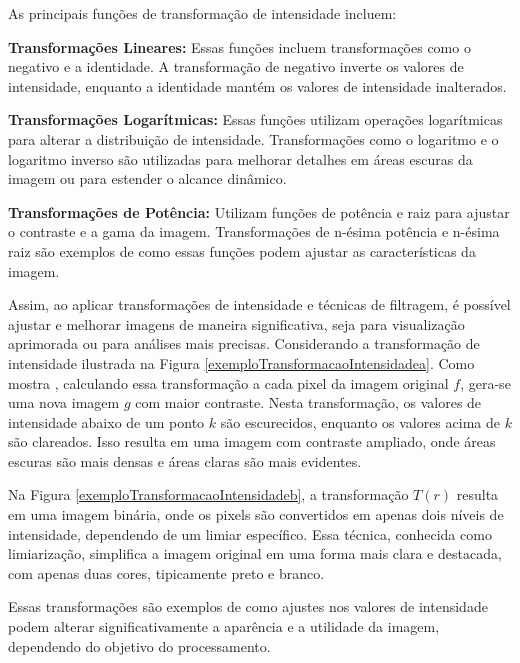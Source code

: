As principais funções de transformação de intensidade incluem:

\textbf{Transformações Lineares:} Essas funções incluem transformações como o negativo e a identidade. A transformação de negativo inverte os valores de intensidade, enquanto a identidade mantém os valores de intensidade inalterados.

\textbf{Transformações Logarítmicas:} Essas funções utilizam operações logarítmicas para alterar a distribuição de intensidade. Transformações como o logaritmo e o logaritmo inverso são utilizadas para melhorar detalhes em áreas escuras da imagem ou para estender o alcance dinâmico.

\textbf{Transformações de Potência:} Utilizam funções de potência e raiz para ajustar o contraste e a gama da imagem. Transformações de n-ésima potência e n-ésima raiz são exemplos de como essas funções podem ajustar as características da imagem.

Assim, ao aplicar transformações de intensidade e técnicas de filtragem, é possível ajustar e melhorar imagens de maneira significativa, seja para visualização aprimorada ou para análises mais precisas.
Considerando a transformação de intensidade ilustrada na Figura \ref{exemploTransformacaoIntensidadea}. Como mostra , calculando essa transformação a cada pixel da imagem original $f$, gera-se uma nova imagem $g$ com maior contraste. Nesta transformação, os valores de intensidade abaixo de um ponto $k$ são escurecidos, enquanto os valores acima de $k$ são clareados. Isso resulta em uma imagem com contraste ampliado, onde áreas escuras são mais densas e áreas claras são mais evidentes.

Na Figura \ref{exemploTransformacaoIntensidadeb}, a transformação $T(r)$ resulta em uma imagem binária, onde os pixels são convertidos em apenas dois níveis de intensidade, dependendo de um limiar específico. Essa técnica, conhecida como limiarização, simplifica a imagem original em uma forma mais clara e destacada, com apenas duas cores, tipicamente preto e branco.

Essas transformações são exemplos de como ajustes nos valores de intensidade podem alterar significativamente a aparência e a utilidade da imagem, dependendo do objetivo do processamento.



